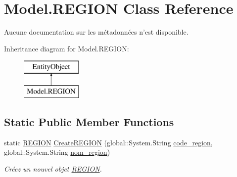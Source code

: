 \hypertarget{class_model_1_1_r_e_g_i_o_n}{\section{Model.\-R\-E\-G\-I\-O\-N Class Reference}
\label{class_model_1_1_r_e_g_i_o_n}
}


Aucune documentation sur les métadonnées n'est disponible.  


Inheritance diagram for Model.\-R\-E\-G\-I\-O\-N\-:\begin{figure}[H]
\begin{center}
\leavevmode
\includegraphics[height=2.000000cm]{class_model_1_1_r_e_g_i_o_n}
\end{center}
\end{figure}
\subsection*{Static Public Member Functions}
\begin{DoxyCompactItemize}
\item 
static \hyperlink{class_model_1_1_r_e_g_i_o_n}{R\-E\-G\-I\-O\-N} \hyperlink{class_model_1_1_r_e_g_i_o_n_a5d9c4388644568f676a3687a11c8c3b6}{Create\-R\-E\-G\-I\-O\-N} (global\-::\-System.\-String \hyperlink{class_model_1_1_r_e_g_i_o_n_a7c0fd7797a562f170daff2673177dc83}{code\-\_\-region}, global\-::\-System.\-String \hyperlink{class_model_1_1_r_e_g_i_o_n_a4dceb2c8c2a0b59bd07caba731ff984a}{nom\-\_\-region})
\begin{DoxyCompactList}\small\item\em Créez un nouvel objet \hyperlink{class_model_1_1_r_e_g_i_o_n}{R\-E\-G\-I\-O\-N}. \end{DoxyCompactList}\end{DoxyCompactItemize}

